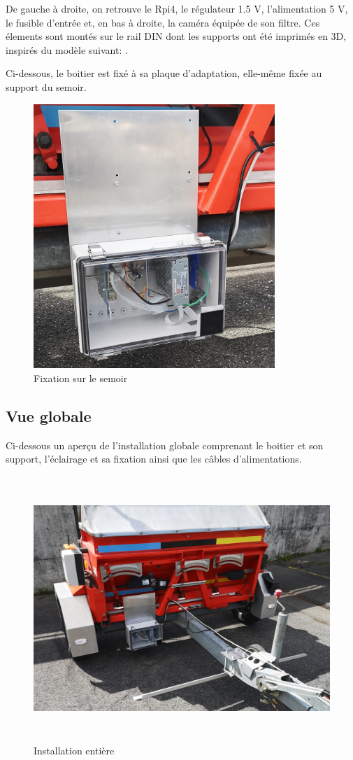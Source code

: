 De gauche à droite, on retrouve le Rpi4, le régulateur 1.5 V, l'alimentation 5 V, le fusible d'entrée et,
en bas à droite, la caméra équipée de son filtre. Ces élements sont montés sur le rail DIN dont les supports ont été imprimés
en 3D, inspirés du modèle suivant: \cite{support_Rpi_3D}.

Ci-dessous, le boitier est fixé à sa plaque d'adaptation, elle-même fixée au support du semoir.

\begin{figure}[H]
    \centering
    \includegraphics[height=10cm]{assets/figures/boitier_adaptation.jpg}
    \caption{Fixation sur le semoir}
\end{figure}

\subsection{Vue globale}
Ci-dessous un aperçu de l'installation globale comprenant le boitier et son support, l'éclairage et sa fixation ainsi que les câbles d'alimentations.
\begin{figure}[H]
    \centering
    \includegraphics[height=10cm]{assets/figures/installation_globale.jpg}
    \caption{Installation entière}
\end{figure}